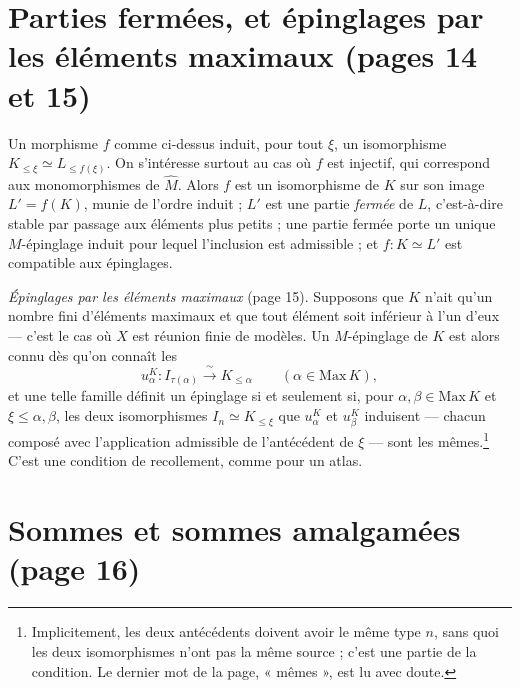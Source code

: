 \documentclass[11pt,a4paper]{article}
\begin{document}
\section*{Parties fermées, et épinglages par les éléments maximaux (pages 14 et 15)}

Un morphisme $f$ comme ci-dessus induit, pour tout $\xi$, un isomorphisme
$K_{\leq \xi} \simeq L_{\leq f(\xi)}$. On s'intéresse surtout au cas où $f$ est
injectif, qui correspond aux monomorphismes de $\widehat{M}$. Alors $f$ est un
isomorphisme de $K$ sur son image $L' = f(K)$, munie de l'ordre induit ; $L'$ est
une partie \emph{fermée} de $L$, c'est-à-dire stable par passage aux éléments
plus petits ; une partie fermée porte un unique $M$-épinglage induit pour
lequel l'inclusion est admissible ; et $f : K \simeq L'$ est compatible aux
épinglages.

\emph{Épinglages par les éléments maximaux} (page 15). Supposons que $K$ n'ait
qu'un nombre fini d'éléments maximaux et que tout élément soit inférieur à
l'un d'eux --- c'est le cas où $X$ est réunion finie de modèles. Un
$M$-épinglage de $K$ est alors connu dès qu'on connaît les
\[
u^{K}_{\alpha} : I_{\tau(\alpha)} \xrightarrow{\;\sim\;} K_{\leq \alpha}
\qquad (\alpha \in \mathrm{Max}\, K),
\]
et une telle famille définit un épinglage si et seulement si, pour
$\alpha, \beta \in \mathrm{Max}\, K$ et $\xi \leq \alpha, \beta$, les deux
isomorphismes $I_{n} \simeq K_{\leq \xi}$ que $u^{K}_{\alpha}$ et
$u^{K}_{\beta}$ induisent --- chacun composé avec l'application admissible de
l'antécédent de $\xi$ --- sont les mêmes.\footnote{Implicitement, les deux
antécédents doivent avoir le même type $n$, sans quoi les deux isomorphismes
n'ont pas la même source ; c'est une partie de la condition. Le dernier mot de
la page, « mêmes », est lu avec doute.} C'est une condition de recollement,
comme pour un atlas.

\section*{Sommes et sommes amalgamées (page 16)}
\end{document}
